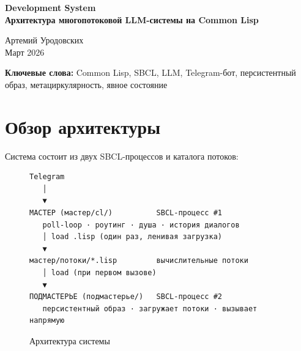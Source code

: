 \documentclass[11pt,a4paper]{article}
\begin{document}
\begin{titlepage}
\centering\vspace*{2.5cm}
{\LARGE\bfseries Development System\\[0.4em]
\large Архитектура многопотоковой LLM-системы на Common Lisp}

\vspace{1.5cm}
{\large Артемий Уродовских}\\[0.2em]
{\normalsize Март 2026}

\vspace{2cm}
\begin{abstract}
\noindent
\textbf{Development System} — двухкомпонентная система оркестрации вычислительных потоков с языковой моделью в роли исполнителя. \textit{Мастер} — Telegram-бот на Common Lisp, принимающий команды и управляющий потоками. \textit{Подмастерье} — персистентный SBCL-образ, в который потоки загружаются динамически без перезапуска.

Поток — автономный модуль CL, определяющий единственную функцию \texttt{выполнить/1}. Поток-порождатель с помощью LLM генерирует новые потоки, компилирует и загружает их в тот же образ, замыкая метациркулярную петлю.

Система полностью написана на Common Lisp (SBCL). Около 1100 строк кода. Мигрирована с Racket в марте 2026 года.
\end{abstract}

\vspace{1cm}
\noindent\textbf{Ключевые слова:}
Common Lisp, SBCL, LLM, Telegram-бот, персистентный образ, метациркулярность, явное состояние
\end{titlepage}

\tableofcontents
\newpage

\section{Обзор архитектуры}

Система состоит из двух SBCL-процессов и каталога потоков:

\begin{figure}[H]\centering\small\begin{verbatim}
Telegram
   │
   ▼
МАСТЕР (мастер/cl/)          SBCL-процесс #1
   poll-loop · роутинг · душа · история диалогов
   │ load .lisp (один раз, ленивая загрузка)
   ▼
мастер/потоки/*.lisp         вычислительные потоки
   │ load (при первом вызове)
   ▼
ПОДМАСТЕРЬЕ (подмастерье/)   SBCL-процесс #2
   персистентный образ · загружает потоки · вызывает напрямую
\end{verbatim}
\caption{Архитектура системы}\end{figure}
\end{document}
